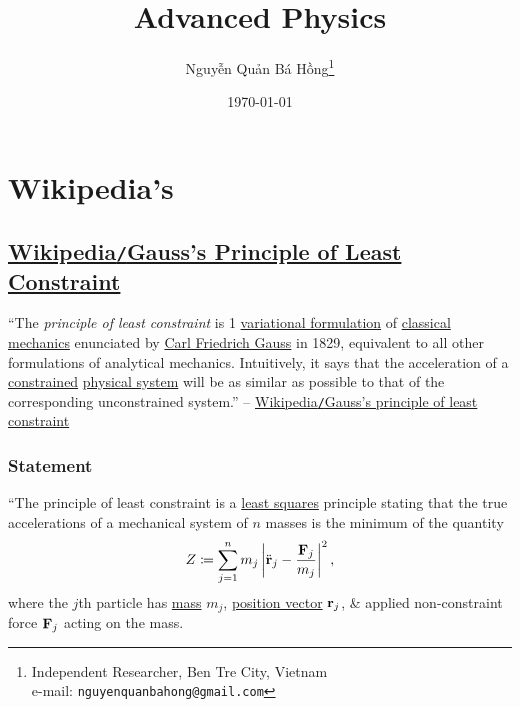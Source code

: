 \documentclass[oneside]{book}
\title{Advanced Physics}
\author{\selectlanguage{vietnamese} Nguyễn Quản Bá Hồng\footnote{Independent Researcher, Ben Tre City, Vietnam\\e-mail: \texttt{nguyenquanbahong@gmail.com}}}
\date{\today}
\numberwithin{equation}{section}
\begin{document}
\maketitle
\setcounter{secnumdepth}{4}
\setcounter{tocdepth}{4}
\tableofcontents


\chapter{Wikipedia's}

\section{\href{https://en.wikipedia.org/wiki/Gauss's_principle_of_least_constraint}{Wikipedia\texttt{/}Gauss's Principle of Least Constraint}}
``The \textit{principle of least constraint} is 1 \href{https://en.wikipedia.org/wiki/Variational_principle}{variational formulation} of \href{https://en.wikipedia.org/wiki/Classical_mechanics}{classical mechanics} enunciated by \href{https://en.wikipedia.org/wiki/Carl_Friedrich_Gauss}{Carl Friedrich Gauss} in 1829, equivalent to all other formulations of analytical mechanics. Intuitively, it says that the acceleration of a \href{https://en.wikipedia.org/wiki/Constraint_(classical_mechanics)}{constrained} \href{https://en.wikipedia.org/wiki/Physical_system}{physical system} will be as similar as possible to that of the corresponding unconstrained system.'' -- \href{https://en.wikipedia.org/wiki/Gauss%27s_principle_of_least_constraint}{Wikipedia\texttt{/}Gauss's principle of least constraint}

\subsection{Statement}
``The principle of least constraint is a \href{https://en.wikipedia.org/wiki/Least_squares}{least squares} principle stating that the true accelerations of a mechanical system of $n$ masses is the minimum of the quantity
\begin{align*}
	Z\coloneqq\sum_{j=1}^n m_j\left|\ddot{\bf r}_j - \frac{{\bf F}_j}{m_j}\right|^2,
\end{align*}
where the $j$th particle has \href{https://en.wikipedia.org/wiki/Mass}{mass} $m_j$, \href{https://en.wikipedia.org/wiki/Position_vector}{position vector} ${\bf r}_j$, \& applied non-constraint force ${\bf F}_j$ acting on the mass.
\end{document}
